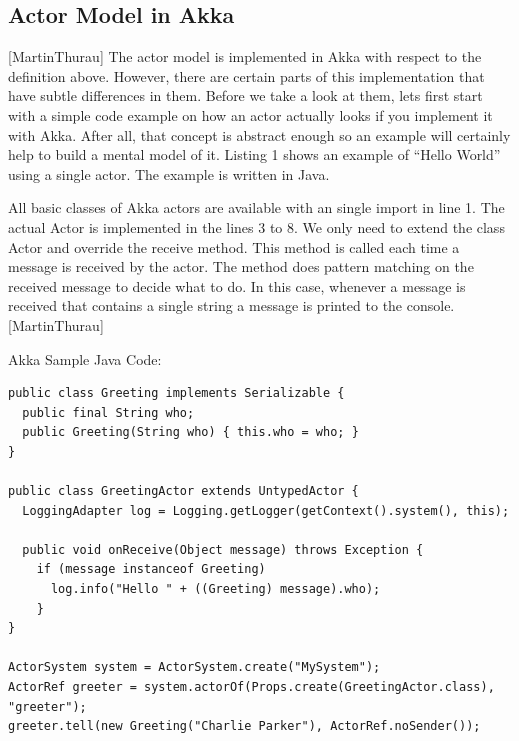   \subsection{Actor Model in Akka}[MartinThurau]
The actor model is implemented in Akka with respect to the definition above. However, there are certain parts of this implementation that have subtle differences in them. Before we take a look at them, lets first start with a simple code example on how an actor actually looks if you implement it with Akka. After all, that concept is abstract enough so an example will certainly help to build a mental model of it. Listing 1 shows an example of “Hello World” using a single actor. The example is written in Java.

All basic classes of Akka actors are available with an single import in line 1. The actual Actor is implemented in the lines 3 to 8. We only need to extend the class Actor and override the receive method. This method is called each time a message is received by the actor. The method does pattern matching on the received message to decide what to do. In this case, whenever a message is received that contains a single string a message is printed to the console.[MartinThurau]

Akka Sample Java Code:~\parencite{akkaHome}
\begin{lstlisting}
public class Greeting implements Serializable {
  public final String who;
  public Greeting(String who) { this.who = who; }
}

public class GreetingActor extends UntypedActor {
  LoggingAdapter log = Logging.getLogger(getContext().system(), this);

  public void onReceive(Object message) throws Exception {
    if (message instanceof Greeting)
      log.info("Hello " + ((Greeting) message).who);
    }
}

ActorSystem system = ActorSystem.create("MySystem");
ActorRef greeter = system.actorOf(Props.create(GreetingActor.class), "greeter");
greeter.tell(new Greeting("Charlie Parker"), ActorRef.noSender());
\end{lstlisting}

